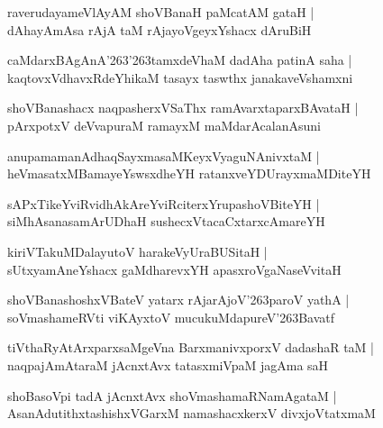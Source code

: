 \documentclass[twoside,12pt,openright]{book}
\def\S{\char'263}
\newcounter{shloka}[chapter]
\begin{document}
\begin{shloka}%
raverudayameVlAyAM shoVBanaH paMcatAM gataH |\\
dAhayAmAsa rAjA taM rAjayoVgeyxYshacx dAruBiH 
\end{shloka}

\begin{shloka}%
caMdarxBAgAnA\S\S tamxdeVhaM dadAha patinA saha |\\
kaqtovxVdhavxRdeYhikaM tasayx taswthx janakaveVshamxni
\end{shloka}

\begin{shloka}%
shoVBanashacx naqpasherxVSaThx ramAvarxtaparxBAvataH |\\
pArxpotxV deVvapuraM ramayxM maMdarAcalanAsuni
\end{shloka}

\begin{shloka}%
anupamamanAdhaqSayxmasaMKeyxVyaguNAnivxtaM |\\
heVmasatxMBamayeYswsxdheYH ratanxveYDUrayxmaMDiteYH
\end{shloka}

\begin{shloka}%
sAPxTikeYviRvidhAkAreYviRciterxYrupashoVBiteYH |\\
siMhAsanasamArUDhaH sushecxVtacaCxtarxcAmareYH
\end{shloka}

\begin{shloka}%
kiriVTakuMDalayutoV harakeVyUraBUSitaH |\\
sUtxyamAneYshacx gaMdharevxYH apasxroVgaNaseVvitaH 
\end{shloka}

\begin{shloka}%
shoVBanashoshxVBateV yatarx rAjarAjoV\S paroV yathA |\\
soVmashameRVti viKAyxtoV mucukuMdapureV\S Bavatf
\end{shloka}

\begin{shloka}%
tiVthaRyAtArxparxsaMgeVna BarxmanivxporxV dadashaR taM |\\
naqpajAmAtaraM jAcnxtAvx tatasxmiVpaM jagAma saH
\end{shloka}

\begin{shloka}%
shoBasoVpi tadA jAcnxtAvx shoVmashamaRNamAgataM |\\
AsanAdutithxtashishxVGarxM namashacxkerxV divxjoVtatxmaM
\end{shloka}
\end{document}
